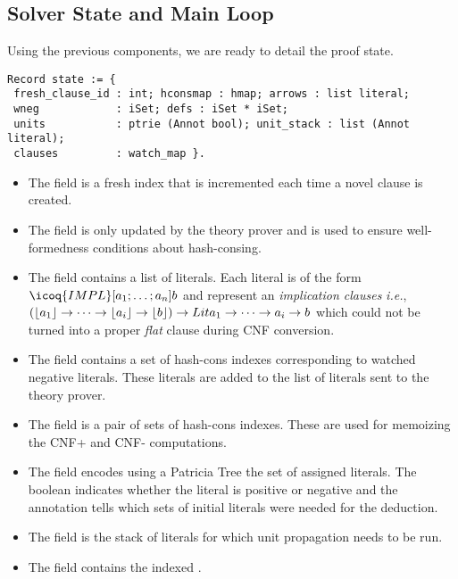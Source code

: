 \documentclass[utf8,a4paper,UKenglish,cleveref, autoref, thm-restate]{lipics-v2021}
\begin{document}
\subsection{Solver State and Main Loop}
\label{sec:solver-state}
Using the previous components, we are ready to detail the proof state. %
\begin{verbatim}
Record state := {
 fresh_clause_id : int; hconsmap : hmap; arrows : list literal;
 wneg            : iSet; defs : iSet * iSet;
 units           : ptrie (Annot bool); unit_stack : list (Annot literal);
 clauses         : watch_map }.
\end{verbatim}
\begin{itemize}
\item The field  is a fresh index that is incremented
  each time a novel clause is created.
\item The field  is only
updated by the theory prover and is used to ensure well-formedness
conditions about hash-consing.
\item The field  contains a list of literals.  Each
  literal is of the form $\icoq{IMPL}[a_1;\dots;a_n] b$ and represent
  an \emph{implication clauses} \emph{i.e.},
  $(\lfloor a_1 \rfloor \to \dots \to \lfloor a_i \rfloor \to \lfloor b \rfloor) \to Lit{a_1 \to
    \dots \to a_i \to b}$ which could not be turned into a proper
  \emph{flat} clause during CNF conversion.
%
\item The field  contains a set of hash-cons indexes
corresponding to watched negative literals. These literals are added
to the list of literals sent to the theory prover.
\item The field  is a pair of sets of hash-cons indexes.
These are used for memoizing the CNF+ and CNF- computations.
\item The field  encodes using a Patricia Tree the set of
assigned literals.  The boolean indicates whether the literal
is positive or negative and the annotation tells which sets of initial
literals were needed for the deduction.
\item The field  is the stack of literals for which
  unit propagation needs to be run.
\item The field  contains the indexed .
\end{itemize}
\end{document}
